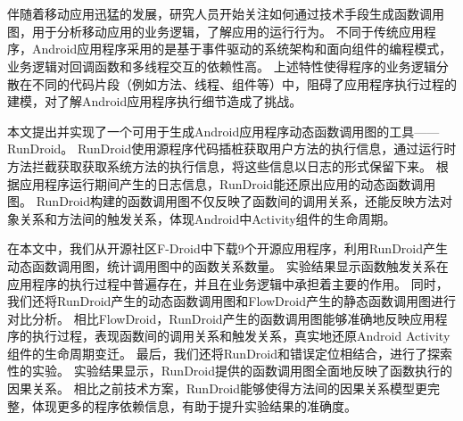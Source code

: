 
\chapter*{}


\setlength{\baselineskip}{25pt}	

伴随着移动应用迅猛的发展，研究人员开始关注如何通过技术手段生成函数调用图，用于分析移动应用的业务逻辑，了解应用的运行行为。
不同于传统应用程序，Android应用程序采用的是基于事件驱动的系统架构和面向组件的编程模式，业务逻辑对回调函数和多线程交互的依赖性高。
上述特性使得程序的业务逻辑分散在不同的代码片段（例如方法、线程、组件等）中，阻碍了应用程序执行过程的建模，对了解Android应用程序执行细节造成了挑战。



本文提出并实现了一个可用于生成Android应用程序动态函数调用图的工具——RunDroid。
RunDroid使用源程序代码插桩获取用户方法的执行信息，通过运行时方法拦截获取获取系统方法的执行信息，将这些信息以日志的形式保留下来。
根据应用程序运行期间产生的日志信息，RunDroid能还原出应用的动态函数调用图。
RunDroid构建的函数调用图不仅反映了函数间的调用关系，还能反映方法对象关系和方法间的触发关系，体现Android中Activity组件的生命周期。




在本文中，我们从开源社区F-Droid中下载9个开源应用程序，利用RunDroid产生动态函数调用图，统计调用图中的函数关系数量。
实验结果显示函数触发关系在应用程序的执行过程中普遍存在，并且在业务逻辑中承担着主要的作用。
同时，我们还将RunDroid产生的动态函数调用图和FlowDroid产生的静态函数调用图进行对比分析。
相比FlowDroid，RunDroid产生的函数调用图能够准确地反映应用程序的执行过程，表现函数间的调用关系和触发关系，真实地还原Android Activity组件的生命周期变迁。
最后，我们还将RunDroid和错误定位相结合，进行了探索性的实验。
实验结果显示，RunDroid提供的函数调用图全面地反映了函数执行的因果关系。
相比之前技术方案，RunDroid能够使得方法间的因果关系模型更完整，体现更多的程序依赖信息，有助于提升实验结果的准确度。



\hspace{-0.5cm}
 
